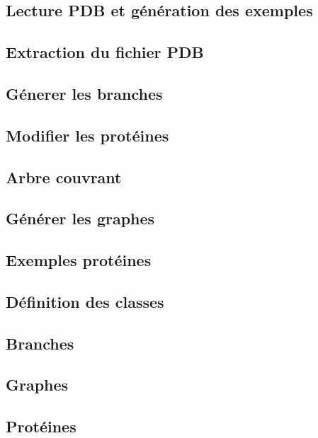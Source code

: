 \begin{frame}
    \section{Lecture PDB et génération des exemples}
    \subsection{Extraction du fichier PDB}
    
    \subsection{Génerer les branches}
    
    \subsection{Modifier les protéines}
    
    \subsection{Arbre couvrant}
    
    \subsection{Générer les graphes}
    
    \subsection{Exemples protéines}
    
\end{frame}
\begin{frame}
    \section{Définition des classes}  
    \subsection{Branches}
    
    \subsection{Graphes}
    
    \subsection{Protéines}
        
\end{frame}
